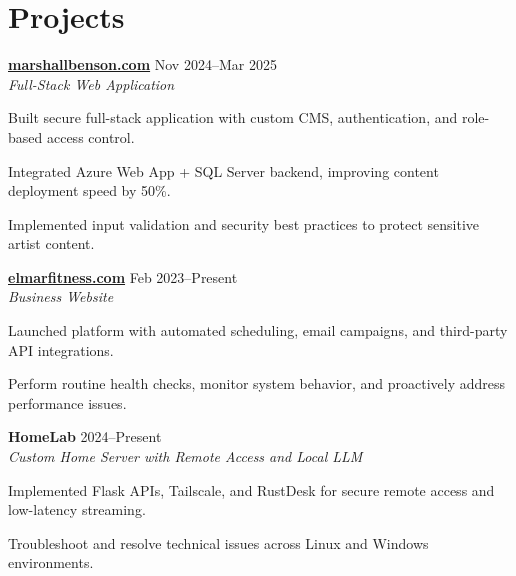 \documentclass[letterpaper,10pt]{article}
\newcommand{\resumeItem}[1]{\item \small{#1}}
\begin{document}
\section*{Projects}
\begin{compactitem}
  \item[]
    \textbf{\href{https://marshallbenson.com}{marshallbenson.com}} \hfill Nov 2024–Mar 2025 \\
    \textit{Full-Stack Web Application}
    
    \begin{compactitem}[leftmargin=0.15in]
      \resumeItem{Built secure full-stack application with custom CMS, authentication, and role-based access control.}
      \resumeItem{Integrated Azure Web App + SQL Server backend, improving content deployment speed by 50\%.}
      \resumeItem{Implemented input validation and security best practices to protect sensitive artist content.}
    \end{compactitem}

  \item[]
    \textbf{\href{https://elmarfitness.com}{elmarfitness.com}} \hfill Feb 2023–Present \\
    \textit{Business Website}
    
    \begin{compactitem}[leftmargin=0.15in]
      \resumeItem{Launched platform with automated scheduling, email campaigns, and third-party API integrations.}
      \resumeItem{Perform routine health checks, monitor system behavior, and proactively address performance issues.}
    \end{compactitem}

  \item[]
    \textbf{HomeLab} \hfill 2024–Present \\
    \textit{Custom Home Server with Remote Access and Local LLM}
    
    \begin{compactitem}[leftmargin=0.15in]
      \resumeItem{Implemented Flask APIs, Tailscale, and RustDesk for secure remote access and low-latency streaming.}
      \resumeItem{Troubleshoot and resolve technical issues across Linux and Windows environments.}
    \end{compactitem}
\end{compactitem}

\end{document}
